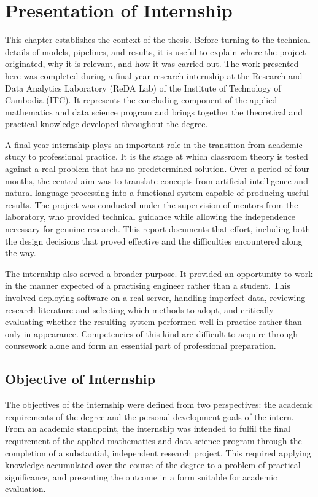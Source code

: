 
\section{Presentation of Internship}

\hs This chapter establishes the context of the thesis. Before turning to the technical
details of models, pipelines, and results, it is useful to explain where the project
originated, why it is relevant, and how it was carried out. The work presented here was
completed during a final year research internship at the Research and Data Analytics
Laboratory (ReDA Lab) of the Institute of Technology of Cambodia (ITC). It represents
the concluding component of the applied mathematics and data science program and brings
together the theoretical and practical knowledge developed throughout the degree.

\hs A final year internship plays an important role in the transition from academic
study to professional practice. It is the stage at which classroom theory is tested
against a real problem that has no predetermined solution. Over a period of four months,
the central aim was to translate concepts from artificial intelligence and natural
language processing into a functional system capable of producing useful results. The
project was conducted under the supervision of mentors from the laboratory, who provided
technical guidance while allowing the independence necessary for genuine research. This
report documents that effort, including both the design decisions that proved effective
and the difficulties encountered along the way.

\hs The internship also served a broader purpose. It provided an opportunity to work in
the manner expected of a practising engineer rather than a student. This involved
deploying software on a real server, handling imperfect data, reviewing research
literature and selecting which methods to adopt, and critically evaluating whether the
resulting system performed well in practice rather than only in appearance. Competencies
of this kind are difficult to acquire through coursework alone and form an essential part
of professional preparation.

\subsection{Objective of Internship}

\hs The objectives of the internship were defined from two perspectives: the academic
requirements of the degree and the personal development goals of the intern. From an
academic standpoint, the internship was intended to fulfil the final requirement of the
applied mathematics and data science program through the completion of a substantial,
independent research project. This required applying knowledge accumulated over the
course of the degree to a problem of practical significance, and presenting the outcome
in a form suitable for academic evaluation.

